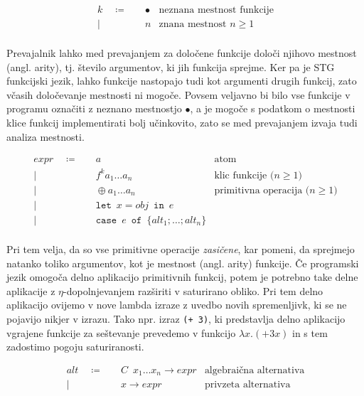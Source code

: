 \begin{align*}
	k \quad \coloneq& \quad \bullet & \text{neznana mestnost funkcije}\\
	\vert& \quad n & \text{znana mestnost $n \geq 1$}\\
\end{align*}

Prevajalnik lahko med prevajanjem za določene funkcije določi njihovo mestnost (angl. arity), tj. število argumentov, ki jih funkcija sprejme. Ker pa je STG funkcijski jezik, lahko funkcije nastopajo tudi kot argumenti drugih funkcij, zato včasih določevanje mestnosti ni mogoče. Povsem veljavno bi bilo vse funkcije v programu označiti z neznano mestnostjo $\bullet$, a je mogoče s podatkom o mestnosti klice funkcij implementirati bolj učinkovito, zato se med prevajanjem izvaja tudi analiza mestnosti. 

\begin{align*}
	expr \quad \coloneq& \quad a & \text{atom}\\
	\vert& \quad f^k a_1 \dots a_n & \text{klic funkcije ($n \geq 1$)}\\
	\vert& \quad \oplus a_1 \dots a_n & \text{primitivna operacija ($n \geq 1$)}\\
	\vert& \quad \texttt{let} \enspace x = obj \enspace \texttt{in} \enspace e & \text{} \\
	\vert& \quad \texttt{case} \enspace e \enspace \texttt{of} \enspace \{ alt_1; \dots; alt_n \}& \text{} \\
\end{align*}


Pri tem velja, da so vse primitivne operacije \textit{zasičene}, kar pomeni, da sprejmejo natanko toliko argumentov, kot je mestnost (angl. arity) funkcije. Če programski jezik omogoča delno aplikacijo primitivnih funkcij, potem je potrebno take delne aplikacije z $\eta$-dopolnjevanjem razširiti v saturirano obliko. Pri tem delno aplikacijo ovijemo v nove lambda izraze z uvedbo novih spremenljivk, ki se ne pojavijo nikjer v izrazu. Tako npr. izraz \texttt{(+ 3)}, ki predstavlja delno aplikacijo vgrajene funkcije za seštevanje prevedemo v funkcijo $\lambda x . (+ 3 x)$ in s tem zadostimo pogoju saturiranosti.

\begin{align*}
	alt \quad \coloneq& \quad C \enspace x_1 \dots x_n \to expr & \text{algebraična alternativa}\\
	\vert& \quad x \to expr & \text{privzeta alternativa}\\
\end{align*}


